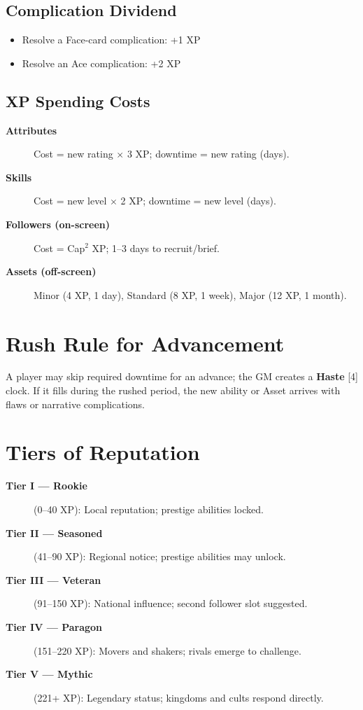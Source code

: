 \subsection{Complication Dividend}
\label{subsec:complication-dividend}
\begin{itemize}
\item Resolve a Face-card complication: +1 XP
\item Resolve an Ace complication: +2 XP
\end{itemize}

\subsection{XP Spending Costs}
\label{subsec:xp-spending}
\begin{description}
\item[\textbf{Attributes}] Cost = new rating $\times$ 3 XP; downtime = new rating (days). 
\item[\textbf{Skills}] Cost = new level $\times$ 2 XP; downtime = new level (days). 
\item[\textbf{Followers (on-screen)}] Cost = Cap$^{2}$ XP; 1–3 days to recruit/brief. 
\item[\textbf{Assets (off-screen)}] Minor (4 XP, 1 day), Standard (8 XP, 1 week), Major (12 XP, 1 month). 
\end{description}

\section{Rush Rule for Advancement}
\label{sec:rush-rule}
A player may skip required downtime for an advance; the GM creates a \textbf{Haste} [4] clock. If it fills during the rushed period, the new ability or Asset arrives with flaws or narrative complications.

\section{Tiers of Reputation}
\label{sec:reputation-tiers}

\begin{description}
\item[\textbf{Tier I — Rookie}] (0–40 XP): Local reputation; prestige abilities locked. 
\item[\textbf{Tier II — Seasoned}] (41–90 XP): Regional notice; prestige abilities may unlock. 
\item[\textbf{Tier III — Veteran}] (91–150 XP): National influence; second follower slot suggested. 
\item[\textbf{Tier IV — Paragon}] (151–220 XP): Movers and shakers; rivals emerge to challenge. 
\item[\textbf{Tier V — Mythic}] (221+ XP): Legendary status; kingdoms and cults respond directly. 
\end{description}
